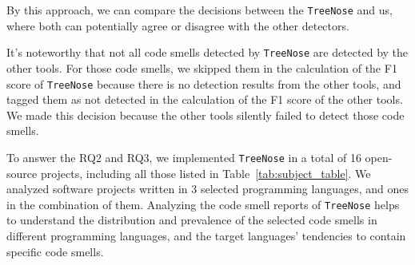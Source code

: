 



By this approach, we can compare the decisions between the \texttt{TreeNose}
and us, where both can potentially agree or disagree with the other detectors.


It's noteworthy that not all code smells detected
by \texttt{TreeNose} are detected by the other tools. For those code smells, we
skipped them in the calculation of the F1 score of \texttt{TreeNose} because
there is no detection results from the other tools, and tagged them as not
detected in the calculation of the F1 score of the other tools. We made this
decision because the other tools silently failed to detect those code smells.

%
To answer the RQ2 and RQ3, we implemented \texttt{TreeNose} in a total of 16
open-source projects, including all those listed in
Table~\ref{tab:subject_table}. We analyzed software projects written in 3
selected programming languages, and ones in the
%
%
combination of them.
%
%
Analyzing the code smell reports of \texttt{TreeNose} helps to understand the
distribution and prevalence of the selected code smells in different
programming languages, and the target languages' tendencies to contain specific
code smells.


